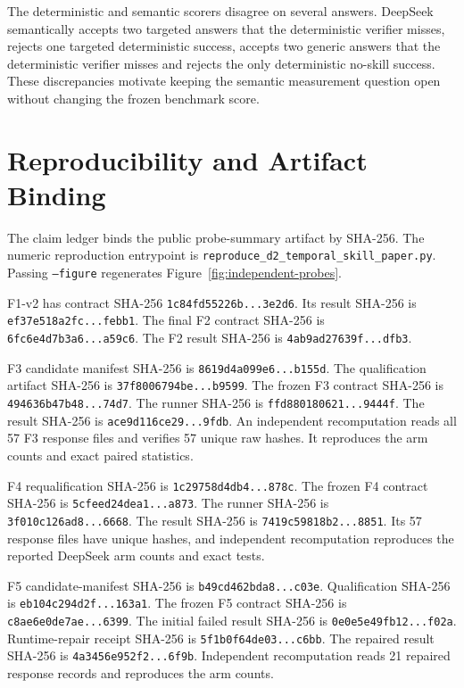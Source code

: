 The deterministic and semantic scorers disagree on several answers. DeepSeek semantically accepts two targeted answers that the deterministic verifier misses, rejects one targeted deterministic success, accepts two generic answers that the deterministic verifier misses and rejects the only deterministic no-skill success. These discrepancies motivate keeping the semantic measurement question open without changing the frozen benchmark score.

\section{Reproducibility and Artifact Binding}
\label{app:repro}
The claim ledger binds the public probe-summary artifact by SHA-256. The numeric reproduction entrypoint is \texttt{reproduce\_d2\_temporal\_skill\_paper.py}. Passing \texttt{--figure} regenerates Figure~\ref{fig:independent-probes}.

F1-v2 has contract SHA-256 \texttt{1c84fd55226b...3e2d6}. Its result SHA-256 is \texttt{ef37e518a2fc...febb1}. The final F2 contract SHA-256 is \texttt{6fc6e4d7b3a6...a59c6}. The F2 result SHA-256 is \texttt{4ab9ad27639f...dfb3}.

F3 candidate manifest SHA-256 is \texttt{8619d4a099e6...b155d}. The qualification artifact SHA-256 is \texttt{37f8006794be...b9599}. The frozen F3 contract SHA-256 is \texttt{494636b47b48...74d7}. The runner SHA-256 is \texttt{ffd880180621...9444f}. The result SHA-256 is \texttt{ace9d116ce29...9fdb}. An independent recomputation reads all 57 F3 response files and verifies 57 unique raw hashes. It reproduces the arm counts and exact paired statistics.

F4 requalification SHA-256 is \texttt{1c29758d4db4...878c}. The frozen F4 contract SHA-256 is \texttt{5cfeed24dea1...a873}. The runner SHA-256 is \texttt{3f010c126ad8...6668}. The result SHA-256 is \texttt{7419c59818b2...8851}. Its 57 response files have unique hashes, and independent recomputation reproduces the reported DeepSeek arm counts and exact tests.

F5 candidate-manifest SHA-256 is \texttt{b49cd462bda8...c03e}. Qualification SHA-256 is \texttt{eb104c294d2f...163a1}. The frozen F5 contract SHA-256 is \texttt{c8ae6e0de7ae...6399}. The initial failed result SHA-256 is \texttt{0e0e5e49fb12...f02a}. Runtime-repair receipt SHA-256 is \texttt{5f1b0f64de03...c6bb}. The repaired result SHA-256 is \texttt{4a3456e952f2...6f9b}. Independent recomputation reads 21 repaired response records and reproduces the arm counts.

